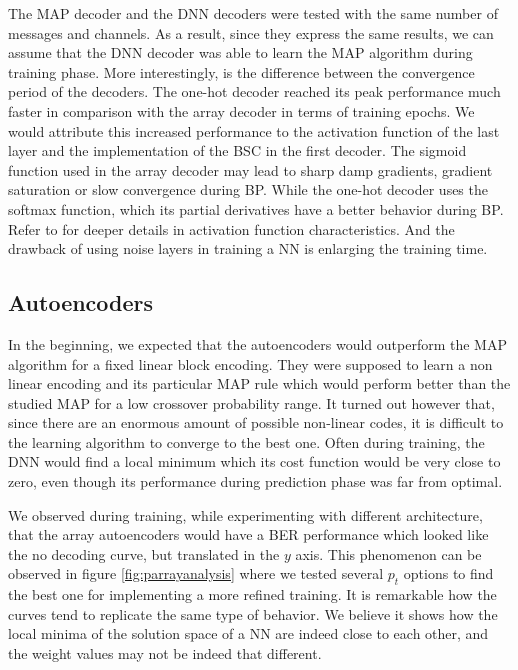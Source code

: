 \documentclass[conference]{IEEEtran}
\begin{document}
The MAP decoder and the DNN decoders were tested with the same number of messages and channels. As a result, since they express the same results, we can assume that the DNN decoder was able to learn the MAP algorithm during training phase. More interestingly, is the difference between the convergence period of the decoders. The one-hot decoder reached its peak performance much faster in comparison with the array decoder in terms of training epochs. We would attribute this increased performance to the activation function of the last layer and the implementation of the BSC in the first decoder. The sigmoid function used in the array decoder may lead to sharp damp gradients, gradient saturation or slow convergence during BP. While the one-hot decoder uses the softmax function, which its partial derivatives have a better behavior during BP. Refer to \cite{2018arXiv181103378N} for deeper details in activation function characteristics. And the drawback of using noise layers in training a NN is enlarging the training time.


\subsection{Autoencoders}

In the beginning, we expected that the autoencoders would outperform the MAP algorithm for a fixed linear block encoding. They were supposed to learn a non linear encoding and its particular MAP rule which would perform better than the studied MAP for a low crossover probability range. It turned out however that, since there are an enormous amount of possible non-linear codes, it is difficult to the learning algorithm to converge to the best one. Often during training, the DNN would find a local minimum which its cost function would be very close to zero, even though its performance during prediction phase was far from optimal.

We observed during training, while experimenting with different architecture, that the array autoencoders would have a BER performance which looked like the no decoding curve, but translated in the $y$ axis. This phenomenon can be observed in figure \ref{fig:parrayanalysis} where we tested several $p_t$ options to find the best one for implementing a more refined training. It is remarkable how the curves tend to replicate the same type of behavior. We believe it shows how the local minima of the solution space of a NN are indeed close to each other, and the weight values may not be indeed that different.
\end{document}
